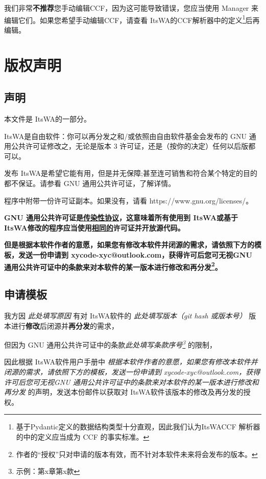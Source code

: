 \documentclass[UTF8]{ctexart}
\newcommand{\itswa}{ItsWA}
\begin{document}
        我们非常\textbf{不推荐}您手动编辑CCF，因为这可能导致错误，您应当使用 Manager 来编辑它们。如果您希望手动编辑CCF，请查看 \itswa 的CCF解析器中的定义\footnote{基于Pydantic定义的数据结构类型十分直观，因此我们认为\itswa CCF 解析器的中的定义应当成为 CCF 的事实标准。}后再编辑。
    
    \section{版权声明}
        \subsection{声明}
            本文件是 \itswa 的一部分。

            \itswa 是自由软件：你可以再分发之和/或依照由自由软件基金会发布的 GNU 通用公共许可证修改之，无论是版本 3 许可证，还是（按你的决定）任何以后版都可以。
            
            发布 \itswa 是希望它能有用，但是并无保障;甚至连可销售和符合某个特定的目的都不保证。请参看 GNU 通用公共许可证，了解详情。
            
            程序中附带一份许可证副本。如果没有，请看 https://www.gnu.org/licenses/。

            \textbf{GNU 通用公共许可证是\uline{传染性协议}，这意味着所有使用到 \itswa 或基于 \itswa 修改的程序应当使用\uline{相同的}许可证并开放源代码。}

            \textbf{但是根据本软件作者的意愿，如果您有修改本软件并闭源的需求，请依照下方的模板，发送一份申请到 xycode-xyc@outlook.com，获得许可后您可无视GNU 通用公共许可证中的条款来对本软件的某一版本进行修改和再分发\footnote{作者的“授权”只对申请的版本有效，而不针对本软件未来将会发布的版本。}。}

        \subsection{申请模板}
            我方因 \textit{此处填写原因} 有对 \itswa 软件的 \textit{此处填写版本（git hash 或版本号）} 版本进行\textbf{修改}后闭源并\textbf{再分发}的需求，

            但因为 GNU 通用公共许可证中的条款\textit{此处填写条款序号\footnote{示例：第x章第x款}} 的限制，

            因此根据 \itswa 软件用户手册中 \textit{根据本软件作者的意愿，如果您有修改本软件并闭源的需求，请依照下方的模板，发送一份申请到 xycode-xyc@outlook.com，获得许可后您可无视GNU 通用公共许可证中的条款来对本软件的某一版本进行修改和再分发} 的声明，发送本份邮件以获取对 \itswa 软件该版本的修改及再分发的授权。
\end{document}
